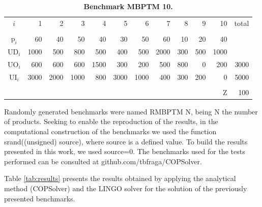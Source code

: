 \documentclass[10pt,fleqn,a4paper,twoside]{article}
\begin{document}
\begin{table}[ht]
\begin{center}
\caption{\textbf{Benchmark MBPTM 10.}}
\begin{small}
\begin{tabular}[c]{c r r r r r r r r r r r }
\\
$i$ & 1 & 2 & 3 & 4 & 5 & 6 & 7 & 8 & 9 & 10 & total \\
\cline {1-12} \\
$\textrm{p}_i$ & 60 & 40 & 50 & 40 & 30 & 50 & 60 & 10 & 20 & 40\\
$\textrm{UD}_i$ & 1000 & 500 & 800 & 500 & 400 & 500 & 2000 & 300 & 500 & 1000 \\
$\textrm{UO}_i$ & 600 & 600 & 600 & 1500 & 300 & 200 & 500 & 800 & 0 & 200 & 3000 \\
$\textrm{UI}_i$ & 3000 & 2000 & 1000 & 800 & 3000 & 1000 & 400 & 300 & 200 & 0 & 5000 \\
\cline {1-12} \\
& & & & & & & & & & $\textrm{Z}$ & 100 \\
\end{tabular}
\label{tab:MBPTMP003}
\end{small}
\end{center}
\end{table}

Randomly generated benchmarks were named RMBPTM $\textrm{N}$, being $\textrm{N}$ the number of products. Seeking to enable the reproduction of the results, in the computational construction of the benchmarks we used the function srand((unsigned) source), where source is a defined value. To build the results presented in this work, we used source=0. The benchmarks used for the tests performed can be consulted at github.com/tbfraga/COPSolver.

Table \ref{tab:results} presents the results obtained by applying the analytical method (COPSolver) and the LINGO solver for the solution of the previously presented benchmarks.
\end{document}
